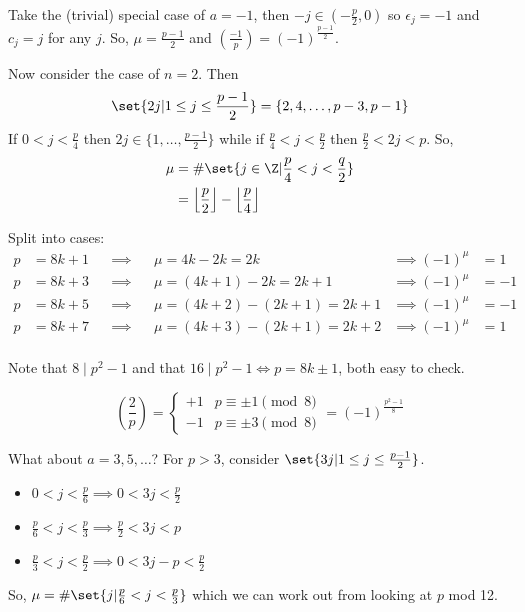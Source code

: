 \documentclass{article}
\newcommand{\legendre}[2]{\genfrac{(}{)}{}{}{#1}{#2}}
\DeclarePairedDelimiter\floor{\lfloor}{\rfloor}
\begin{document}
\begin{eg}
    Take the (trivial) special case of $a = -1$, then $-j \in (-\frac{p}{2}, 0)$ so $\epsilon_j = -1$ and $c_j = j$ for any $j$.
    So, $\mu = \frac{p-1}{2}$ and $\legendre{-1}{p} = (-1)^\frac{p-1}{2}$.

    Now consider the case of $n=2$.  Then
    \begin{equation*}
        \set{2j | 1 \leq j \leq \frac{p-1}{2}} = \{2, 4, \dotsc, p-3, p-1\}
    \end{equation*}
    If $0 < j < \frac{p}{4}$ then $2j \in \{1, \dotsc, \frac{p-1}{2}\}$ while if $\frac{p}{4} < j < \frac{p}{2}$ then $\frac{p}{2} < 2j < p$.
    So,
    \begin{align*}
        \mu &= \# \set{j \in \Z | \frac{p}{4} < j < \frac{q}{2}} \\
            &= \floor*{\frac{p}{2}} - \floor*{\frac{p}{4}}
    \end{align*}

    Split into cases:
    \begin{align*}
        p &= 8k+1 &&\implies &&\mu = 4k - 2k = 2k &\implies (-1)^\mu &= 1 \\
        p &= 8k+3 &&\implies &&\mu = (4k+1) - 2k = 2k+1 &\implies (-1)^\mu &= -1 \\
        p &= 8k+5 &&\implies &&\mu = (4k+2) - (2k+1) = 2k+1 &\implies (-1)^\mu &= -1 \\
        p &= 8k+7 &&\implies &&\mu = (4k+3) - (2k+1) = 2k+2 &\implies (-1)^\mu &= 1 \\
    \end{align*}

    Note that $8 \mid p^2 - 1$ and that $16 \mid p^2 - 1 \iff p = 8k \pm 1$, both easy to check.
\end{eg}

\begin{ncor}\label{cor:3.4}
    \begin{equation*}
        \legendre{2}{p} =
        \begin{cases}
            +1 & p \equiv \pm 1 \pmod{8} \\
            -1 & p \equiv \pm 3 \pmod{8}
        \end{cases}
        = (-1)^\frac{p^2 - 1}{8}
    \end{equation*}
\end{ncor}

What about $a = 3, 5, \dotsc$?  For $p > 3$, consider $\set{3j | 1 \leq j \leq \frac{p-1}{2}}$.
\begin{itemize}[label={}]
    \item $0 < j < \frac{p}{6} \implies 0 < 3j < \frac{p}{2}$
    \item $\frac{p}{6} < j < \frac{p}{3} \implies \frac{p}{2} < 3j < p$
    \item $\frac{p}{3} < j < \frac{p}{2} \implies 0 < 3j - p < \frac{p}{2}$
\end{itemize}
So, $\mu = \#\set{j | \frac{p}{6} < j < \frac{p}{3}}$ which we can work out from looking at $p$ mod 12.
\end{document}
